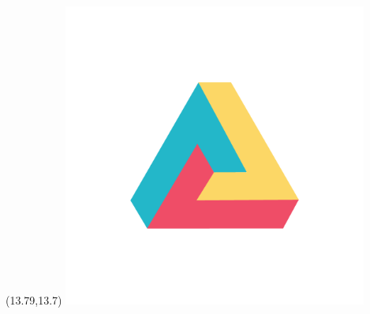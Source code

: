 \documentclass[22pt]{beamer}
\begin{document}
\begin{frame}[fragile]
\begin{textblock}{2}
\end{textblock}
\begin{textblock}{2}(13.79,13.7)
\includegraphics[height=10cm]{dh.png} 
\end{textblock}

\end{frame}
\end{document}
